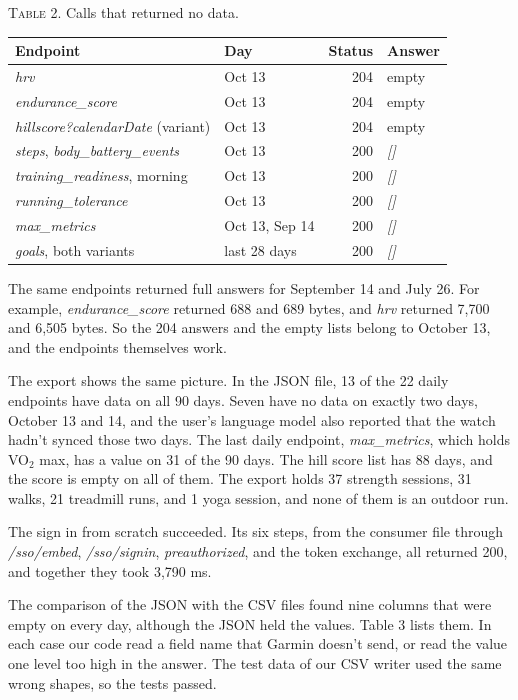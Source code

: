 \documentclass[11pt]{article}
\newcommand\code[1]{\textit{#1}}
\begin{document}
\begin{center}\footnotesize
\textsc{Table 2.} Calls that returned no data.\par\smallskip
\begin{tabular}{@{}llrl@{}}
\toprule
Endpoint & Day & Status & Answer \\
\midrule
\code{hrv} & Oct 13 & 204 & empty \\
\code{endurance\_score} & Oct 13 & 204 & empty \\
\code{hillscore?calendarDate} (variant) & Oct 13 & 204 & empty \\
\code{steps}, \code{body\_battery\_events} & Oct 13 & 200 & \code{[]} \\
\code{training\_readiness}, morning & Oct 13 & 200 & \code{[]} \\
\code{running\_tolerance} & Oct 13 & 200 & \code{[]} \\
\code{max\_metrics} & Oct 13, Sep 14 & 200 & \code{[]} \\
\code{goals}, both variants & last 28 days & 200 & \code{[]} \\
\bottomrule
\end{tabular}
\end{center}

The same endpoints returned full answers for September 14 and July 26. For example, \code{endurance\_score} returned 688 and 689 bytes, and \code{hrv} returned 7,700 and 6,505 bytes. So the 204 answers and the empty lists belong to October 13, and the endpoints themselves work.

The export shows the same picture. In the JSON file, 13 of the 22 daily endpoints have data on all 90 days. Seven have no data on exactly two days, October 13 and 14, and the user's language model also reported that the watch hadn't synced those two days. The last daily endpoint, \code{max\_metrics}, which holds VO$_2$ max, has a value on 31 of the 90 days. The hill score list has 88 days, and the score is empty on all of them. The export holds 37 strength sessions, 31 walks, 21 treadmill runs, and 1 yoga session, and none of them is an outdoor run.

The sign in from scratch succeeded. Its six steps, from the consumer file through \code{/sso/embed}, \code{/sso/signin}, \code{preauthorized}, and the token exchange, all returned 200, and together they took 3,790 ms.

The comparison of the JSON with the CSV files found nine columns that were empty on every day, although the JSON held the values. Table 3 lists them. In each case our code read a field name that Garmin doesn't send, or read the value one level too high in the answer. The test data of our CSV writer used the same wrong shapes, so the tests passed.
\end{document}
